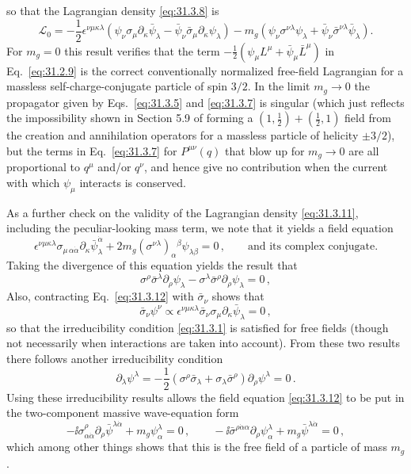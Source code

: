 so that the Lagrangian density \eqref{eq:31.3.8} is
\begin{equation}
  \mathcal L_0
  =-\frac12\epsilon^{\nu\mu\kappa\lambda}
    \left(
      \psi_\nu\sigma_\mu\partial_\kappa\bar\psi_\lambda
      -\bar\psi_\nu\bar\sigma_\mu\partial_\kappa\psi_\lambda
    \right)
   -m_g\left(
      \psi_\nu\sigma^{\nu\lambda}\psi_\lambda
      +\bar\psi_\nu\bar\sigma^{\nu\lambda}\bar\psi_\lambda
    \right).
  \tag{31.3.11}\label{eq:31.3.11}
\end{equation}
For \(m_g=0\) this result verifies that the term
\(-\frac12(\psi_\mu L^\mu+\bar\psi_\mu\bar L^\mu)\) in
Eq.~\eqref{eq:31.2.9} is the correct
conventionally normalized free-field Lagrangian for a massless
self-charge-conjugate particle of spin \(3/2\). In the limit \(m_g\to0\)
the propagator given by Eqs.~\eqref{eq:31.3.5} and \eqref{eq:31.3.7} is
singular (which just reflects the impossibility shown in Section 5.9 of
forming a \((1,\frac12)+(\frac12,1)\) field from the creation and
annihilation operators for a massless particle of helicity \(\pm3/2\)),
but the terms in Eq.~\eqref{eq:31.3.7} for \(P^{\mu\nu}(q)\) that blow up
for \(m_g\to0\) are all proportional to \(q^\mu\) and/or \(q^\nu\), and
hence give no contribution when the current with which \(\psi_\mu\)
interacts is conserved.

As a further check on the validity of the Lagrangian density
\eqref{eq:31.3.11}, including the peculiar-looking mass term, we note that
it yields a field equation
\begin{equation}
  \epsilon^{\nu\mu\kappa\lambda}
  \sigma_{\mu\,\alpha\dot\alpha}
  \partial_\kappa\bar\psi_\lambda^{\dot\alpha}
  +2m_g(\sigma^{\nu\lambda})_\alpha{}^\beta
  \psi_{\lambda\beta}=0\,,
  \qquad\text{and its complex conjugate}.
  \tag{31.3.12}\label{eq:31.3.12}
\end{equation}
Taking the divergence of this equation yields the result that
\[
  \sigma^\rho\bar\sigma^\lambda
  \partial_\rho\psi_\lambda
  -\sigma^\lambda\bar\sigma^\rho
  \partial_\rho\psi_\lambda=0\,,
\]
Also, contracting Eq.~\eqref{eq:31.3.12} with
\(\bar\sigma_\nu\) shows that
\[
  \bar\sigma_\nu\psi^\nu
  \propto\epsilon^{\nu\mu\kappa\lambda}
  \bar\sigma_\nu\sigma_\mu\partial_\kappa\bar\psi_\lambda
  =0\,,
\]
so that the irreducibility condition \eqref{eq:31.3.1} is satisfied for
free fields (though not necessarily when interactions are taken into
account). From these two results there follows another irreducibility
condition
\[
  \partial_\lambda\psi^\lambda
  =-\frac12
   \left(\sigma^\rho\bar\sigma_\lambda
         +\sigma_\lambda\bar\sigma^\rho\right)
   \partial_\rho\psi^\lambda=0\,.
\]
Using these irreducibility results allows the field equation
\eqref{eq:31.3.12} to be put in the two-component massive wave-equation form
\begin{equation}
  -\ii\sigma^\rho_{\alpha\dot\alpha}
  \partial_\rho\bar\psi^{\lambda\dot\alpha}
  +m_g\psi^\lambda_\alpha=0\,,
  \qquad
  -\ii\bar\sigma^{\rho\dot\alpha\alpha}
  \partial_\rho\psi^\lambda_\alpha
  +m_g\bar\psi^{\lambda\dot\alpha}=0\,,
  \tag{31.3.13}\label{eq:31.3.13}
\end{equation}
which among other things shows that this is the free field of a particle
of mass \(m_g\).

